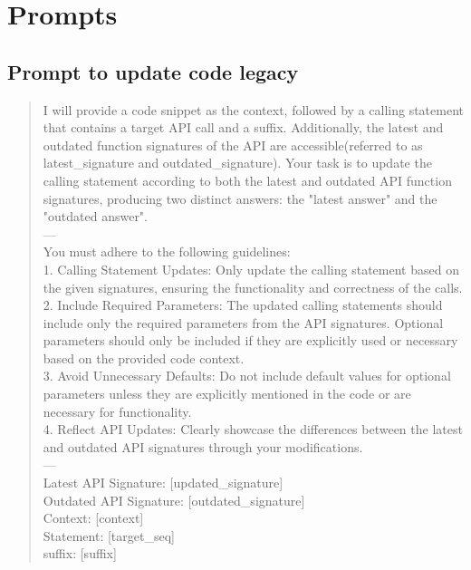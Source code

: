 \clearpage
\section{Prompts}
\subsection{Prompt to update code legacy}
\label{appx_update_code_prompt}
\begin{tcolorbox}[colback=gray!5!white,width=\linewidth, left=-3mm, right=-3mm, top=1mm, bottom=1mm, center]
\begin{quote}
\small
{
I will provide a code snippet as the context, followed by a calling statement that contains a target API call and a suffix. Additionally, the latest and outdated function signatures of the API are accessible(referred to as latest\_signature and outdated\_signature). Your task is to update the calling statement according to both the latest and outdated API function signatures, producing two distinct answers: the "latest answer" and the "outdated answer". \\
---\\
You must adhere to the following guidelines: \\
1. Calling Statement Updates: Only update the calling statement based on the given signatures, ensuring the functionality and correctness of the calls.\\
2. Include Required Parameters: The updated calling statements should include only the required parameters from the API signatures. Optional parameters should only be included if they are explicitly used or necessary based on the provided code context.\\
3. Avoid Unnecessary Defaults: Do not include default values for optional parameters unless they are explicitly mentioned in the code or are necessary for functionality.\\
4. Reflect API Updates: Clearly showcase the differences between the latest and outdated API signatures through your modifications.\\
---\\
Latest API Signature: {[updated\_signature]}\\
Outdated API Signature: {[outdated\_signature]}\\
Context: {[context]}\\
Statement: {[target\_seq]}\\
suffix: {[suffix]}\\
}
\end{quote}
\end{tcolorbox}

